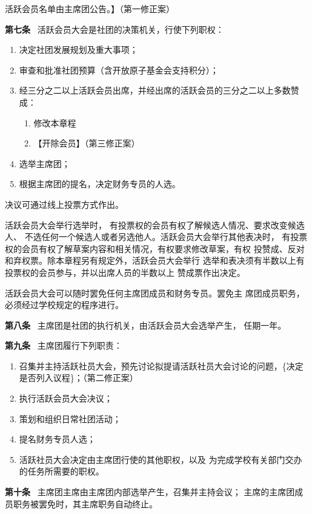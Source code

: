 \documentclass{gbt9704}
\begin{document}
活跃会员名单由主席团公告。】（第一修正案）


\textbf{第七条}~ 活跃会员大会是社团的决策机关，行使下列职权：
\begin{enumerate}
    \item 决定社团发展规划及重大事项；
    \item 审查和批准社团预算（含开放原子基金会支持积分）；
    \item 经三分之二以上活跃会员出席，并经出席的活跃会员的三分之二以上多数赞成：
        \begin{enumerate}
            \item 修改本章程
            \item 【开除会员】（第三修正案）
        \end{enumerate}
    \item 选举主席团；
    \item 根据主席团的提名，决定财务专员的人选。
\end{enumerate}


决议可通过线上投票方式作出。

活跃会员大会举行选举时，
有投票权的会员有权了解候选人情况、要求改变候选人、
不选任何一个候选人或者另选他人。活跃会员大会举行其他表决时，
有投票权的会员有权了解草案内容和相关情况，有权要求修改草案，有权
投赞成、反对和弃权票。除本章程另有规定外，活跃会员大会举行
选举和表决须有半数以上有投票权的会员参与，并以出席人员的半数以上
赞成票作出决定。


活跃会员大会可以随时罢免任何主席团成员和财务专员。罢免主
席团成员职务，必须经过学校规定的程序进行。


\textbf{第八条}~ 主席团是社团的执行机关，由活跃会员大会选举产生，
任期一年。


\textbf{第九条}~ 主席团履行下列职责：
\begin{enumerate}
    \item 召集并主持活跃社员大会，预先讨论拟提请活跃社员大会讨论的问题，\{决定是否列入议程\}；（第二修正案）
    \item 执行活跃会员大会决议；
    \item 策划和组织日常社团活动；
    \item 提名财务专员人选；
    \item 活跃社员大会决定由主席团行使的其他职权，以及
    为完成学校有关部门交办的任务所需要的职权。
\end{enumerate}


\textbf{第十条}~ 主席团主席由主席团内部选举产生，召集并主持会议；
主席的主席团成员职务被罢免时，其主席职务自动终止。
\end{document}
